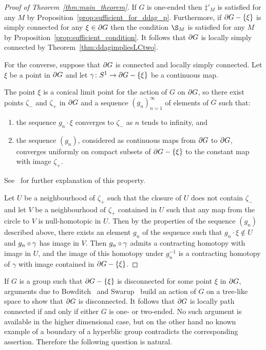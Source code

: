 \documentclass[a4paper]{article}
\begin{document}
\begin{proof}[Proof of Theorem~\ref{thm:main_theorem}]
  If $G$ is one-ended then $\ddag'_M$ is satisfied for any $M$ by
  Proposition~\ref{prop:sufficient_for_ddag_p}. Furthermore, if $\partial G -
  \left\{\xi\right\}$ is simply connected for any $\xi \in \partial G$ then the condition
  $\S_M$ is satisfied for any $M$ by
  Proposition~\ref{prop:sufficient_condition}. It follows that $\partial G$ is
  locally simply connected by Theorem~\ref{thm:ddagimpliesLCtwo}.

  For the converse, suppose that $\partial G$ is connected and locally simply
  connected. Let $\xi$ be a point in $\partial G$ and let $\gamma\colon
  S^1\to\partial G - \left\{\xi\right\}$ be a continuous map. 

  The point $\xi$ is a conical limit point for the action of $G$ on $\partial
  G$, so there exist points $\zeta_-$ and $\zeta_+$ in $\partial G$ and a
  sequence $(g_n)_{n = 1}^\infty$ of elements of $G$ such that:
  \begin{enumerate}
    \item the sequence $g_n\cdot\xi$ converges to $\zeta_-$ as $n$ tends to
      infinity, and
    \item the sequence $(g_n)$, considered as continuous maps from $\partial
      G$ to $\partial G$, converges uniformly on compact subsets of $\partial
      G - \left\{\xi\right\}$ to the constant map with image $\zeta_+$.
  \end{enumerate}
  See~\cite{bowditch99c} for further explanation of this property.

  Let $U$ be a neighbourhood of $\zeta_+$ such that the closure of $U$ does not
  contain $\zeta_-$ and let $V$ be a neighbourhood of $\zeta_+$ contained in
  $U$ such that any map from the circle to $V$ is null-homotopic in $U$. Then by
  the properties of the sequence $(g_n)$ described above, there exists an
  element $g_n$ of the sequence such that $g_n\cdot\xi \notin U$ and
  $g_n\circ\gamma$ has image in $V$. Then $g_n\circ\gamma$ admits a
  contracting homotopy with image in $U$, and the image of this homotopy under
  $g_n^{-1}$ is a contracting homotopy of $\gamma$ with image contained in
  $\partial G - \left\{\xi\right\}$.
\end{proof}

If $G$ is a group such that $\partial G - \left\{\xi\right\}$ is disconnected for some
point $\xi$ in $\partial G$, arguments due to Bowditch~\cite{bowditch98b} and
Swarup~\cite{swarup96} build an action of $G$ on a tree-like space to show that
$\partial G$ is disconnected. It follows that $\partial G$ is locally path
connected if and only if either $G$ is one- or two-ended. No such argument is
available in the higher dimensional case, but on the other hand no known
example of a boundary of a hyperblic group contradicts the corresponding
assertion. Therefore the following question is natural.
\end{document}
